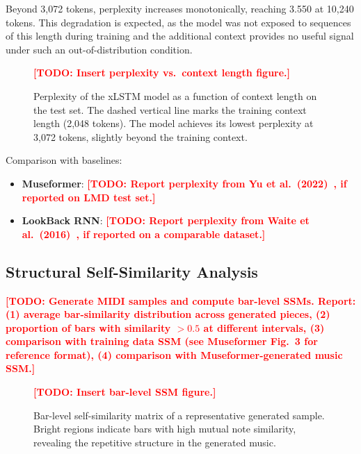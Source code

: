 \documentclass[conference]{IEEEtran}
\newcommand{\TODO}[1]{\textcolor{red}{\textbf{[TODO: #1]}}}
\begin{document}
Beyond 3,072 tokens, perplexity increases monotonically, reaching
3.550 at 10,240 tokens. This degradation is expected, as the model
was not exposed to sequences of this length during training and the
additional context provides no useful signal under such an out-of-distribution
condition.

\begin{figure}[t]
  \centering
  \TODO{Insert perplexity vs.\ context length figure.}
  \caption{Perplexity of the xLSTM model as a function of context
           length on the test set. The dashed vertical line marks the
           training context length (2,048 tokens). The model achieves
           its lowest perplexity at 3,072 tokens, slightly beyond the
           training context.}
  \label{fig:ppl_curve}
\end{figure}

Comparison with baselines:
\begin{itemize}
    \item \textbf{Museformer}: \TODO{Report perplexity from Yu et al.\
          (2022)~\cite{yu2022}, if reported on LMD test set.}
    \item \textbf{LookBack RNN}: \TODO{Report perplexity from Waite et al.\
          (2016)~\cite{waite2016}, if reported on a comparable dataset.}
\end{itemize}

\subsection{Structural Self-Similarity Analysis}
\label{ssec:ssm}

\TODO{Generate MIDI samples and compute bar-level SSMs. Report:
(1) average bar-similarity distribution across generated pieces,
(2) proportion of bars with similarity $> 0.5$ at different intervals,
(3) comparison with training data SSM (see Museformer Fig.\ 3 for reference format),
(4) comparison with Museformer-generated music SSM.}

\begin{figure}[t]
  \centering
  \TODO{Insert bar-level SSM figure.}
  \caption{Bar-level self-similarity matrix of a representative
           generated sample. Bright regions indicate bars with high
           mutual note similarity, revealing the repetitive structure
           in the generated music.}
  \label{fig:ssm}
\end{figure}
\end{document}
